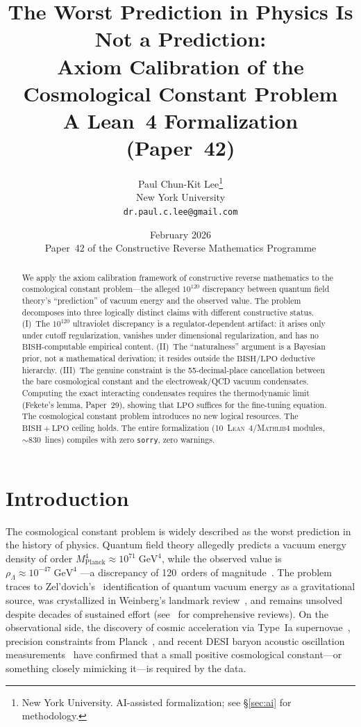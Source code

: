 \documentclass[11pt,a4paper]{article}
\title{%
  \textbf{The Worst Prediction in Physics Is Not a Prediction:\\
  Axiom Calibration of the Cosmological Constant Problem}\\[6pt]
  {\normalsize A Lean~4 Formalization (Paper~42)}%
}
\author{
  Paul Chun-Kit Lee\thanks{%
    New York University.
    AI-assisted formalization; see \S\ref{sec:ai} for methodology.} \\
  New York University \\
  \texttt{dr.paul.c.lee@gmail.com}
}
\date{February 2026\\[4pt]
  {\small Paper~42 of the Constructive Reverse Mathematics Programme}}
\theoremstyle{plain}
\theoremstyle{definition}
\newcommand{\LPO}{\ensuremath{\mathrm{LPO}}}
\newcommand{\BISH}{\ensuremath{\mathrm{BISH}}}
\newcommand{\Lean}{\textsc{Lean~4}}
\newcommand{\Mathlib}{\textsc{Mathlib4}}
\newcommand{\MPl}{M_{\mathrm{Planck}}}
\begin{document}
\maketitle

\begin{abstract}
We apply the axiom calibration framework of constructive reverse
mathematics to the cosmological constant problem---the alleged
$10^{120}$ discrepancy between quantum field theory's ``prediction''
of vacuum energy and the observed value.  The problem decomposes
into three logically distinct claims with different constructive
status.
(I)~The $10^{120}$ ultraviolet discrepancy is a
regulator-dependent artifact: it arises only under cutoff
regularization, vanishes under dimensional regularization,
and has no $\BISH$-computable empirical content.
(II)~The ``naturalness'' argument is a Bayesian prior, not a
mathematical derivation; it resides outside the $\BISH/\LPO$
deductive hierarchy.
(III)~The genuine constraint is the 55-decimal-place cancellation
between the bare cosmological constant and the electroweak/QCD
vacuum condensates.  Computing the exact interacting condensates
requires the thermodynamic limit (Fekete's lemma, Paper~29),
showing that $\LPO$ suffices for the fine-tuning equation.
The cosmological constant problem introduces no new logical
resources.  The $\BISH + \LPO$ ceiling holds.
The entire formalization (10~\Lean{}/\Mathlib{} modules, ${\sim}830$~lines)
compiles with zero \texttt{sorry}, zero warnings.
\end{abstract}

\section{Introduction}\label{sec:intro}

The cosmological constant problem is widely described as the worst
prediction in the history of physics.  Quantum field theory allegedly
predicts a vacuum energy density of order $\MPl^4 \approx 10^{71}\;\mathrm{GeV}^4$,
while the observed value is $\rho_\Lambda \approx 10^{-47}\;\mathrm{GeV}^4$
---a discrepancy of 120~orders of magnitude~\cite{Weinberg1989}.
The problem traces to Zel'dovich's~\cite{Zeldovich1968} identification
of quantum vacuum energy as a gravitational source, was crystallized
in Weinberg's landmark review~\cite{Weinberg1989}, and remains
unsolved despite decades of sustained effort
(see~\cite{Carroll2001,Padmanabhan2003,Martin2012} for comprehensive reviews).
On the observational side, the discovery of cosmic acceleration via
Type~Ia supernovae~\cite{Riess1998,Perlmutter1999}, precision
constraints from Planck~\cite{Planck2020}, and recent DESI baryon
acoustic oscillation measurements~\cite{DESI2024} have confirmed that
a small positive cosmological constant---or something closely
mimicking it---is required by the data.
\end{document}
